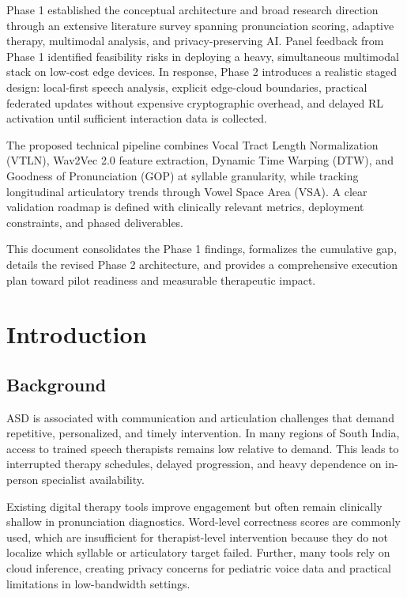 \documentclass[12pt,a4paper]{article}
\begin{document}
Phase 1 established the conceptual architecture and broad research direction through an extensive literature survey spanning pronunciation scoring, adaptive therapy, multimodal analysis, and privacy-preserving AI. Panel feedback from Phase 1 identified feasibility risks in deploying a heavy, simultaneous multimodal stack on low-cost edge devices. In response, Phase 2 introduces a realistic staged design: local-first speech analysis, explicit edge-cloud boundaries, practical federated updates without expensive cryptographic overhead, and delayed RL activation until sufficient interaction data is collected.

The proposed technical pipeline combines Vocal Tract Length Normalization (VTLN), Wav2Vec 2.0 feature extraction, Dynamic Time Warping (DTW), and Goodness of Pronunciation (GOP) at syllable granularity, while tracking longitudinal articulatory trends through Vowel Space Area (VSA). A clear validation roadmap is defined with clinically relevant metrics, deployment constraints, and phased deliverables.

This document consolidates the Phase 1 findings, formalizes the cumulative gap, details the revised Phase 2 architecture, and provides a comprehensive execution plan toward pilot readiness and measurable therapeutic impact.

\newpage
\tableofcontents
\newpage

\section{Introduction}
\subsection{Background}
ASD is associated with communication and articulation challenges that demand repetitive, personalized, and timely intervention. In many regions of South India, access to trained speech therapists remains low relative to demand. This leads to interrupted therapy schedules, delayed progression, and heavy dependence on in-person specialist availability.

Existing digital therapy tools improve engagement but often remain clinically shallow in pronunciation diagnostics. Word-level correctness scores are commonly used, which are insufficient for therapist-level intervention because they do not localize which syllable or articulatory target failed. Further, many tools rely on cloud inference, creating privacy concerns for pediatric voice data and practical limitations in low-bandwidth settings.
\end{document}
